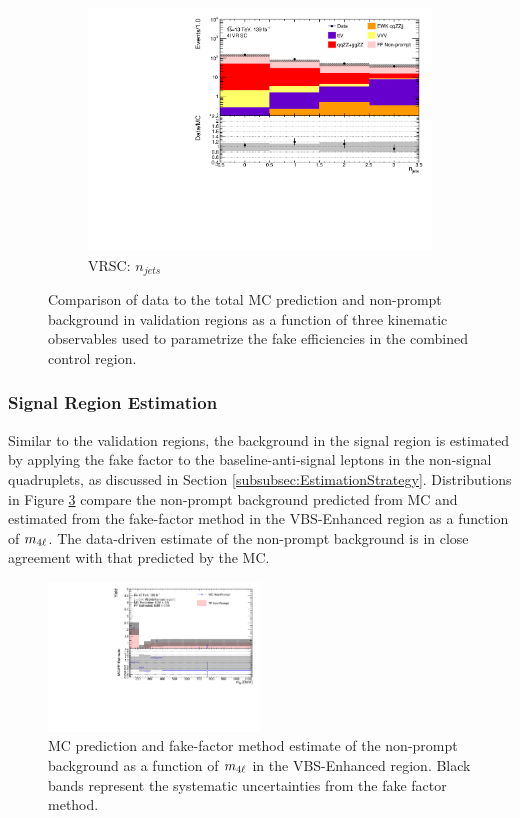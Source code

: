 \begin{figure}[!htb]
\begin{subfigure}{.48\textwidth}
        \includegraphics[width = 0.85\linewidth]{figures/Analysis/Background/Overlay_VRSC_FFApplied_n_jets.pdf}
        \caption{VRSC: $n_{jets}$ \label{fig:AllDataMCYield_VRSC_njet}}
    \end{subfigure}
        \caption{ Comparison of data to the total MC prediction and non-prompt background in validation regions as a function of three kinematic observables used to parametrize the fake efficiencies in the combined control region.\label{fig:AllDataMCYield}}
\end{figure}

\subsubsection{Signal Region Estimation}
\label{subsubsec:SREstimation}
Similar to the validation regions, the background in the signal region is estimated by applying the fake factor to the baseline-anti-signal leptons in the non-signal quadruplets, as discussed in Section \ref{subsubsec:EstimationStrategy}. Distributions in Figure \ref{fig:MCFFRedComparison} compare the non-prompt background predicted from MC and estimated from the fake-factor method in the VBS-Enhanced region as a function of $m_{4\ell}$. The data-driven estimate of the non-prompt background is in close agreement with that predicted by the MC.

\begin{figure}[!htb]
    \centering
    \includegraphics[width=0.5\textwidth]{figures/Analysis/Background/MCRedCompare_VBS_Enhanced_M4l.pdf}
    \caption{ MC prediction and fake-factor method estimate of the non-prompt background as a function of $m_{4\ell}$ in the VBS-Enhanced region. Black bands represent the systematic uncertainties from the fake factor method. \label{fig:MCFFRedComparison}}
\end{figure}

